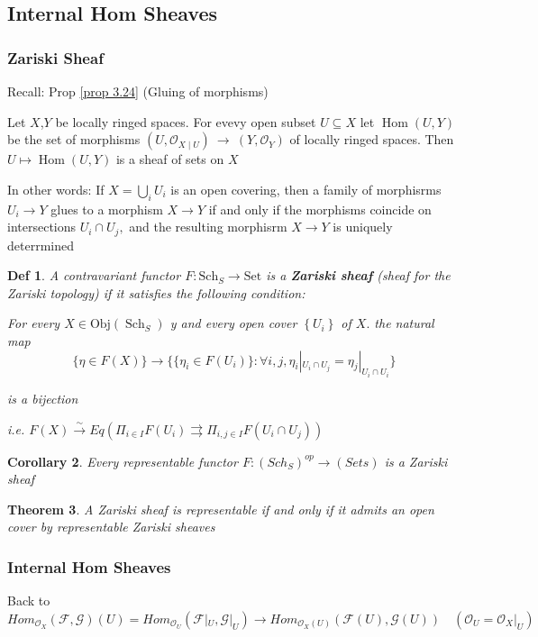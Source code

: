 \documentclass{article}
\newtheorem{theorem}{Theorem}[section]
\newtheorem{definition}[theorem]{Def}
\newtheorem{corollary}[theorem]{Corollary}
\begin{document}
\newpage
\subsection{Internal Hom Sheaves}
\subsubsection{Zariski Sheaf}
Recall:
Prop \ref{prop 3.24} (Gluing of morphisms) 
    
    Let $X$,$Y$ be locally ringed spaces. For evevy open subset $U\subseteq X$ let $\operatorname{Hom}(U,Y)$ be the set of morphisms $(U,{\mathcal{O}}_{X\mid U})\ \to\ (Y,{\mathcal{O}}_{Y})$ of locally ringed spaces. Then $U\mapsto\operatorname{Hom}(U,Y)$ is a sheaf of sets on $X$ 

In other words: If $X=\bigcup_{i}U_{i}$ is an open covering, then a family of morphisrms $U_{i}\to Y$ glues to a morphism $X\to Y$ if and only if the morphisms coincide on intersections $U_{i}\cap U_{j},$ and the resulting morphisrm $X\to Y$ is uniquely deterrmined


\begin{definition}
A contravariant functor $F:\mathrm{Sch}_{S}\rightarrow\mathrm{Set}$ is a \textbf{Zariski sheaf} (sheaf for the
Zariski topology) if it satisfies the following condition:
    
For every $X\in{\mathrm{Obj}}(\operatorname{Sch}_{S})$ y and every open cover $\left\{U_{i}\right\}$ of $X.$ the natural map
$$
\{\eta\in F(X)\}\to\{\{\eta_{i}\in F(U_{i})\}:\forall i,j,\eta_{i}|_{U_{i}\cap U_{j}}=\eta_{j}|_{U_{i}\cap U_{i}}\} 
$$

is a bijection

i.e. $F(X)\xrightarrow{\sim}Eq(\Pi_{i\in I}F(U_i)\rightrightarrows \Pi_{i,j\in I}F(U_i\cap U_j))$
\end{definition}

\begin{corollary}
Every representable functor $F : (Sch_S)
^{op} \to (Sets)$ is a Zariski sheaf 
\end{corollary}

\begin{theorem}
    A Zariski sheaf is representable if and only if it admits an open cover by representable Zariski sheaves
\end{theorem}

\subsubsection{Internal Hom Sheaves}
Back to ${Hom}_{\mathcal O_X}(\mathcal F,\mathcal G)(U)
={Hom}_{\mathcal O_U}(\mathcal F|_U,\mathcal G|_U)
\to {Hom}_{\mathcal O_X(U)}(\mathcal F(U),\mathcal G(U))
\quad (\mathcal O_U=\mathcal O_X|_U)$
\end{document}
